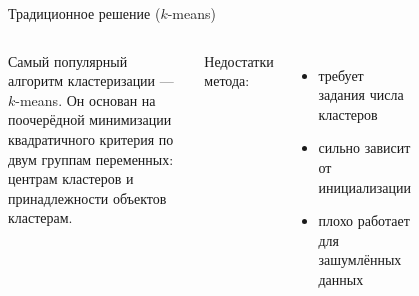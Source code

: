 \documentclass[aspectratio=169,tikz]{beamer}
\newcommand{\kmeans}{\mbox{$ k $-means}\xspace}
\begin{document}
	\begin{frame}{Традиционное решение (\kmeans)}

       \begin{columns}
       	

   		\parbox{\linewidth}{
	       	Самый популярный алгоритм кластеризации --- \kmeans. Он основан на поочерёдной минимизации квадратичного критерия по двум группам переменных: центрам кластеров и принадлежности объектов кластерам.
		}

		\vspace*{1\baselineskip} 
       	Недостатки метода:
       	\begin{itemize}
       		\item требует задания числа кластеров
       		\item сильно зависит от инициализации
       		\item плохо работает для зашумлённых данных
	    \end{itemize}
       	
       	\centering
       	\vspace{-.4cm}
		\begin{figure} %
			\centering
			
		\end{figure}
       \end{columns} 

	\end{frame}

	
\end{document}
